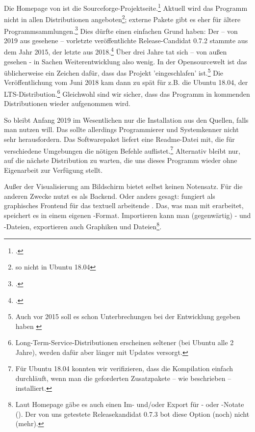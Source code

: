 Die Homepage von  ist die
Sourceforge-Projektseite.\footcite[vgl.][\nopage wp]{Canorus2019a} Aktuell wird
das Programm nicht in allen Distributionen angeboten\footnote{so nicht in Ubuntu
18.04}; externe Pakete gibt es eher für ältere
Programmsammlungen.\footcite[vgl.][\nopage wp]{RepoCanorus2019a} Dies dürfte
einen einfachen Grund haben: Der -- von 2019 aus gesehene -- vorletzte
veröffentlichte Release-Candidat 0.7.2 stammte aus dem Jahr 2015, der letzte aus
2018.\footcite[vgl.][\nopage wp]{Canorus2019b} Über drei Jahre tat sich -- von
außen gesehen - in Sachen Weiterentwicklung also wenig. In der Opensourcewelt
ist das üblicherweise ein Zeichen dafür, dass das Projekt 'eingeschlafen'
ist.\footnote{Auch vor 2015 soll es schon Unterbrechungen bei der Entwicklung
gegeben haben \cite[vgl.][\nopage wp]{UbuntuCanorus2014a}} Die Veröffentlichung
vom Juni 2018 kam dann zu spät für z.B. die Ubuntu 18.04, der
LTS-Distribution.\footnote{Long-Term-Service-Distributionen erscheinen seltener
(bei Ubuntu alle 2 Jahre), werden dafür aber länger mit Updates versorgt.}
Gleichwohl sind wir sicher, dass das Programm in kommenden Distributionen wieder
aufgenommen wird.

So bleibt Anfang 2019 im Wesentlichen nur die Installation aus den Quellen,
falls man  nutzen will. Das sollte allerdings Programmierer und
Systemkenner nicht sehr herausfordern. Das Softwarepaket liefert eine
Readme-Datei mit, die für verschiedene Umgebungen die nötigen Befehle
auflistet.\footnote{Für Ubuntu 18.04 konnten wir verifizieren, dass die
Kompilation einfach durchläuft, wenn man die geforderten Zusatzpakete -- wie
beschrieben -- installiert.} Alternativ bleibt nur, auf die nächste
Distribution zu warten, die uns dieses Programm wieder ohne Eigenarbeit zur
Verfügung stellt.

Außer der Visualisierung am Bildschirm bietet  selbst keinen
Notensatz. Für die anderen Zwecke nutzt es  als Backend. Oder
anders gesagt:  fungiert als graphisches Frontend für das textuell
arbeitende . Das, was man mit  erarbeitet, speichert
es in einem eigenen -Format. Importieren kann man (gegenwärtig)
- und -Dateien, exportieren auch Graphiken und
Dateien\footnote{Laut Homepage gäbe es auch einen Im- und/oder
Export für - oder -Notate (\cite[vgl.][\nopage
wp]{Canorus2019a}). Der von uns getestete Releasekandidat 0.7.3 bot diese Option
(noch) nicht (mehr).}.


